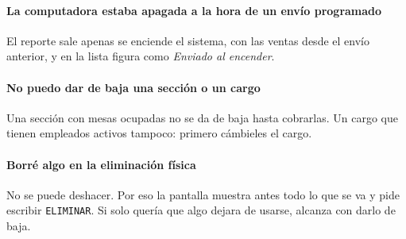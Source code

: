 \paragraph{La computadora estaba apagada a la hora de un envío programado} El reporte sale apenas se enciende el sistema, con las ventas desde el envío anterior, y en la lista figura como \textit{Enviado al encender}.

\paragraph{No puedo dar de baja una sección o un cargo} Una sección con mesas ocupadas no se da de baja hasta cobrarlas. Un cargo que tienen empleados activos tampoco: primero cámbieles el cargo.

\paragraph{Borré algo en la eliminación física} No se puede deshacer. Por eso la pantalla muestra antes todo lo que se va y pide escribir \texttt{ELIMINAR}. Si solo quería que algo dejara de usarse, alcanza con darlo de baja.
